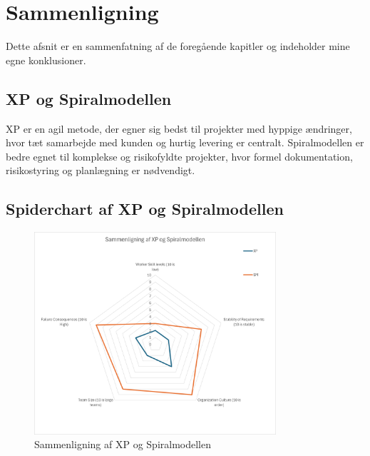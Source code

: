 \chapter{Sammenligning}
\label{chapter:conclusion}
Dette afsnit er en sammenfatning af de foregående kapitler og indeholder mine egne konklusioner.



\section{XP og Spiralmodellen}
XP er en agil metode, der egner sig bedst til projekter med hyppige ændringer, hvor tæt samarbejde med kunden og hurtig levering er centralt. 
Spiralmodellen er bedre egnet til komplekse og risikofyldte projekter, hvor formel dokumentation, risikostyring og planlægning er nødvendigt.

\section{Spiderchart af XP og Spiralmodellen}
\label{sec:spiderchart}
\begin{figure}[H]
    \centering
    \includegraphics[width=0.8\textwidth]{figures/spiderchart.png}
    \caption{Sammenligning af XP og Spiralmodellen}
    \label{fig:spiderchart}
\end{figure}

